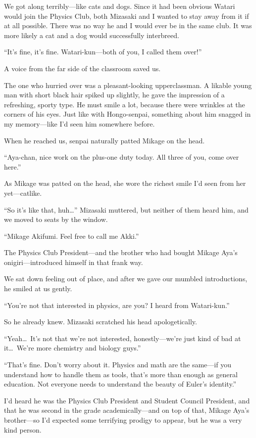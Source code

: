 \documentclass[
    a4paper,
    12pt,
    twoside,
    openany,
    UTF8,
    fontset=windows
]{ctexbook}
\begin{document}
We got along terribly---like cats and dogs. Since it had been obvious Watari would join the Physics Club, both Mizasaki and I wanted to stay away from it if at all possible. There was no way he and I would ever be in the same club. It was more likely a cat and a dog would successfully interbreed.

``It's fine, it's fine. Watari-kun---both of you, I called them over!''

A voice from the far side of the classroom saved us.

The one who hurried over was a pleasant-looking upperclassman. A likable young man with short black hair spiked up slightly, he gave the impression of a refreshing, sporty type. He must smile a lot, because there were wrinkles at the corners of his eyes. Just like with Hongo-senpai, something about him snagged in my memory---like I'd seen him somewhere before.

When he reached us, senpai naturally patted Mikage on the head.

``Aya-chan, nice work on the plus-one duty today. All three of you, come over here.''

As Mikage was patted on the head, she wore the richest smile I'd seen from her yet---catlike.

``So it's like that, huh\dots'' Mizasaki muttered, but neither of them heard him, and we moved to seats by the window.

``Mikage Akifumi. Feel free to call me Akki.''

The Physics Club President---and the brother who had bought Mikage Aya's onigiri---introduced himself in that frank way.

We sat down feeling out of place, and after we gave our mumbled introductions, he smiled at us gently.

``You're not that interested in physics, are you? I heard from Watari-kun.''

So he already knew. Mizasaki scratched his head apologetically.

``Yeah\dots\ It's not that we're not interested, honestly---we're just kind of bad at it\dots\ We're more chemistry and biology guys.''

``That's fine. Don't worry about it. Physics and math are the same---if you understand how to handle them as tools, that's more than enough as general education. Not everyone needs to understand the beauty of Euler's identity.''

I'd heard he was the Physics Club President and Student Council President, and that he was second in the grade academically---and on top of that, Mikage Aya's brother---so I'd expected some terrifying prodigy to appear, but he was a very kind person.
\end{document}
